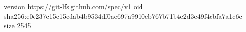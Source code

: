 version https://git-lfs.github.com/spec/v1
oid sha256:e0c237c15c15cdab4b9534df0ae697a9910eb767b71b4e2d3e49f4ebfa7a1c6c
size 2545
